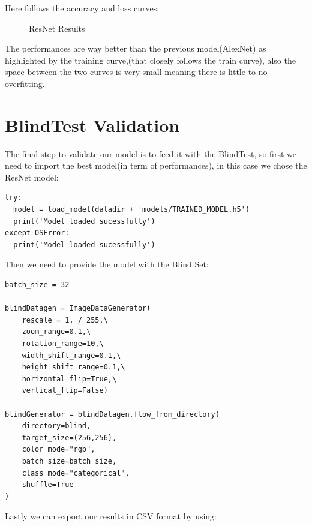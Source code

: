\documentclass{article}
\begin{document}
Here follows the accuracy and loss curves:

\begin{figure}[h]
\centering
{}%
\hfill %
%
\caption{ResNet Results}
\end{figure}

The performances are way better than the previous model(AlexNet) as highlighted by the training curve,(that closely follows the train curve), also the space between the two curves is very small meaning there is little to no overfitting.

\clearpage
\section{BlindTest Validation}

The final step to validate our model is to feed it with the BlindTest, so first we need to import the best model(in term of performances), in this case we chose the ResNet model:

\begin{verbatim}
try:
  model = load_model(datadir + 'models/TRAINED_MODEL.h5')
  print('Model loaded sucessfully')
except OSError:
  print('Model loaded sucessfully')
\end{verbatim}
Then we need to provide the model with the Blind Set:

\begin{verbatim}
batch_size = 32

blindDatagen = ImageDataGenerator(
    rescale = 1. / 255,\
    zoom_range=0.1,\
    rotation_range=10,\
    width_shift_range=0.1,\
    height_shift_range=0.1,\
    horizontal_flip=True,\
    vertical_flip=False)

blindGenerator = blindDatagen.flow_from_directory(
    directory=blind,
    target_size=(256,256),
    color_mode="rgb",
    batch_size=batch_size,
    class_mode="categorical",
    shuffle=True
)
\end{verbatim}
Lastly we can export our results in CSV format by using:
\end{document}
